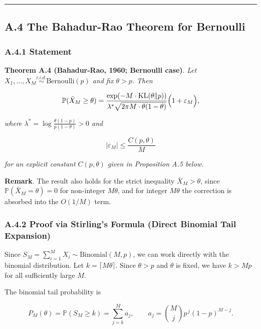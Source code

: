 \documentclass[
  12pt,
]{article}
\begin{document}
\begin{center}\rule{0.5\linewidth}{0.5pt}\end{center}

\subsection{A.4 The Bahadur-Rao Theorem for
Bernoulli}\label{a.4-the-bahadur-rao-theorem-for-bernoulli}

\subsubsection{A.4.1 Statement}\label{a.4.1-statement}

\textbf{Theorem A.4 (Bahadur-Rao, 1960; Bernoulli case)}. \emph{Let
\(X_1,\ldots,X_M \stackrel{i.i.d.}{\sim} \text{Bernoulli}(p)\) and fix
\(\theta > p\). Then}

\[
\mathbb{P}(\bar{X}_M \geq \theta) = \frac{\exp(-M \cdot \text{KL}(\theta \| p))}
{\lambda^* \sqrt{2\pi M \cdot \theta(1-\theta)}}
\Bigl(1 + \varepsilon_M\Bigr),
\]

\emph{where \(\lambda^* = \log\frac{\theta(1-p)}{p(1-\theta)} > 0\) and}

\[|\varepsilon_M| \leq \frac{C(p,\theta)}{M}\]

\emph{for an explicit constant \(C(p,\theta)\) given in Proposition A.5
below.}

\textbf{Remark}. The result also holds for the strict inequality
\(\bar{X}_M > \theta\), since \(\mathbb{P}(\bar{X}_M = \theta) = 0\) for
non-integer \(M\theta\), and for integer \(M\theta\) the correction is
absorbed into the \(O(1/M)\) term.

\subsubsection{A.4.2 Proof via Stirling's Formula (Direct Binomial Tail
Expansion)}\label{a.4.2-proof-via-stirlings-formula-direct-binomial-tail-expansion}

Since \(S_M = \sum_{i=1}^M X_i \sim \text{Binomial}(M,p)\), we can work
directly with the binomial distribution. Let
\(k = \lceil M\theta \rceil\). Since \(\theta > p\) and \(\theta\) is
fixed, we have \(k > Mp\) for all sufficiently large \(M\).

The binomial tail probability is

\[P_M(\theta) = \mathbb{P}(S_M \geq k) = \sum_{j=k}^M a_j, \qquad
a_j = \binom{M}{j} p^{\,j}(1-p)^{M-j}.\]
\end{document}
